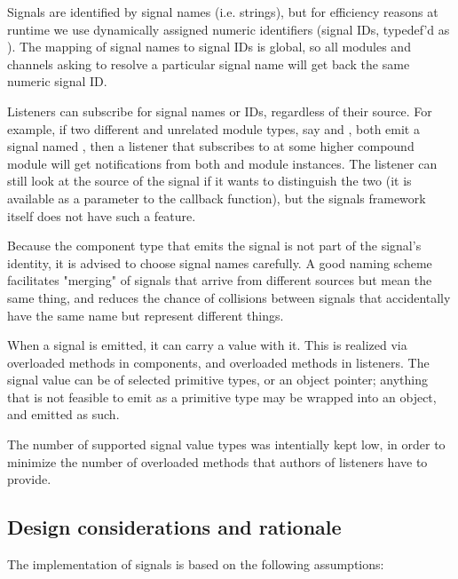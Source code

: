 Signals are identified by signal names (i.e. strings), but for efficiency reasons
at runtime we use dynamically assigned numeric identifiers (signal IDs,
typedef'd as ). The mapping of signal names to signal IDs is
global, so all modules and channels asking to resolve a particular signal name
will get back the same numeric signal ID.

Listeners can subscribe for signal names or IDs, regardless of their
source. For example, if two different and unrelated module types, say
 and , both emit a signal named , then
a listener that subscribes to  at some higher compound module
will get notifications from both  and  module
instances. The listener can still look at the source of the signal if it
wants to distinguish the two (it is available as a parameter to the
callback function), but the signals framework itself does not have such a
feature.

\begin{note}
  Because the component type that emits the signal is not part of the signal's
  identity, it is advised to choose signal names carefully. A good naming scheme
  facilitates "merging" of signals that arrive from different sources but
  mean the same thing, and reduces the chance of collisions between signals that
  accidentally have the same name but represent different things.
\end{note}

When a signal is emitted, it can carry a value with it. This is realized via
overloaded  methods in components, and overloaded 
methods in listeners. The signal value can be of selected primitive types, or an
object pointer; anything that is not feasible to emit as a primitive type may be
wrapped into an object, and emitted as such.

\begin{note}
  The number of supported signal value types was intentially kept low, in order
  to minimize the number of overloaded methods that authors of listeners have
  to provide.
\end{note}

\subsection{Design considerations and rationale}

The implementation of signals is based on the following assumptions:

